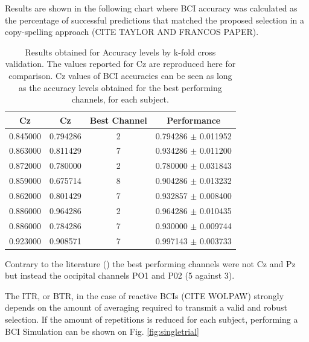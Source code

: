 \documentclass[entropy,article,submit,moreauthors,pdftex,10pt,a4paper]{mdpi}
\begin{document}
Results are shown in the following chart where BCI accuracy
was calculated as the percentage of successful predictions
that matched the proposed selection in a copy-spelling approach (CITE TAYLOR AND  FRANCOS PAPER).

\begin{table}[H]
\caption{Results obtained for Accuracy levels by k-fold cross validation. The values reported for Cz are reproduced here for comparison. Cz values of BCI accuracies can be seen as long as the accuracy levels obtained for the best performing channels, for each subject.}
\centering
\begin{tabular}{cccc}
\toprule
\textbf{Cz}	& \textbf{Cz}	& \textbf{Best Channel}	& \textbf{Performance}\\
\midrule
0.845000     & 0.794286 & 2 & 0.794286 $\pm$ 0.011952 \\
0.863000     & 0.811429 & 7 & 0.934286 $\pm$ 0.011200 \\
0.872000     & 0.780000 & 2 & 0.780000 $\pm$ 0.031843 \\
0.859000     & 0.675714 & 8 & 0.904286 $\pm$ 0.013232 \\
0.862000     & 0.801429 & 7 & 0.932857 $\pm$ 0.008400 \\
0.886000     & 0.964286 & 2 & 0.964286 $\pm$ 0.010435 \\
0.886000     & 0.784286 & 7 & 0.930000 $\pm$ 0.009744 \\
0.923000     & 0.908571 & 7 & 0.997143 $\pm$ 0.003733 \\
\bottomrule
\end{tabular}
\end{table}

Contrary to the literature (\citep{Huggins2016,Jure2016}) the best performing channels were not Cz and Pz but instead the occipital channels PO1 and P02 (5 against 3).

The ITR, or BTR, in the case of reactive BCIs (CITE WOLPAW) strongly depends on the amount of averaging required to transmit a valid and robust selection.  If the amount of repetitions is reduced for each subject, performing a BCI Simulation can be shown on Fig. \ref{fig:singletrial}
\end{document}
